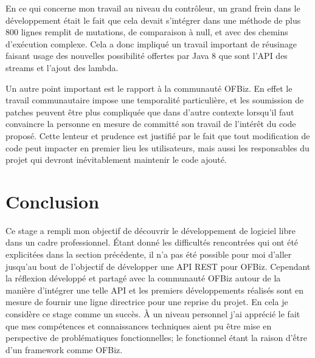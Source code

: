 \documentclass[a4paper, 11pt]{report}
\begin{document}
En ce qui concerne mon travail au niveau du contrôleur, un grand frein
dans le développement était le fait que cela devait s'intégrer dans
une méthode de plus 800 lignes remplit de mutations, de comparaison à
null, et avec des chemins d'exécution complexe. Cela a donc impliqué
un travail important de réusinage faisant usage des nouvelles
possibilité offertes par Java 8 que sont l'API des streams et l'ajout
des lambda.

Un autre point important est le rapport à la communauté OFBiz. En
effet le travail communautaire impose une temporalité particulière, et
les soumission de patches peuvent être plus compliquée que dans
d'autre contexte lorsqu'il faut convaincre la personne en mesure de
committé son travail de l'intérêt du code proposé. Cette lenteur et
prudence est justifié par le fait que tout modification de code peut
impacter en premier lieu les utilisateurs, mais aussi les responsables
du projet qui devront inévitablement maintenir le code ajouté.

\chapter{Conclusion}

Ce stage a rempli mon objectif de découvrir le développement de
logiciel libre dans un cadre professionnel. Étant donné les
difficultés rencontrées qui ont été explicitées dans la section
précédente, il n'a pas été possible pour moi d'aller jusqu'au bout de
l'objectif de développer une API REST pour OFBiz. Cependant la
réflexion développé et partagé avec la communauté OFBiz autour de la
manière d'intégrer une telle API et les premiers développements
réalisés sont en mesure de fournir une ligne directrice pour une
reprise du projet. En cela je considère ce stage comme un succès. À un
niveau personnel j'ai apprécié le fait que mes compétences et
connaissances techniques aient pu être mise en perspective de
problématiques fonctionnelles; le fonctionnel étant la raison d'ếtre
d'un framework comme OFBiz.

\clearpage


\end{document}
